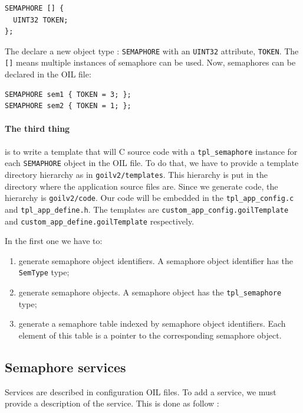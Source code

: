 \documentclass[11pt]{article}
\begin{document}
\begin{lstlisting}
SEMAPHORE [] {
  UINT32 TOKEN;
};
\end{lstlisting}

The declare a new object type : \lstinline{SEMAPHORE} with an \lstinline{UINT32} attribute, \lstinline{TOKEN}. The \lstinline{[]} means multiple instances of semaphore can be used.
Now, semaphores can be declared in the OIL file:

\begin{lstlisting}
SEMAPHORE sem1 { TOKEN = 3; };
SEMAPHORE sem2 { TOKEN = 1; };
\end{lstlisting}

\paragraph{The third thing} is to write a template that will C source code with a \lstinline{tpl_semaphore} instance for each \lstinline{SEMAPHORE} object in the OIL file. To do that, we have to provide a template directory hierarchy as in \lstinline{goilv2/templates}. This hierarchy is put in the directory where the application source files are. Since we generate code, the hierarchy is \lstinline{goilv2/code}. Our code  will be embedded in the \lstinline{tpl_app_config.c} and \lstinline{tpl_app_define.h}. The templates are \lstinline{custom_app_config.goilTemplate} and \lstinline{custom_app_define.goilTemplate} respectively.

In the first one we have to:
\begin{enumerate}
\item generate semaphore object identifiers. A semaphore object identifier has the \lstinline{SemType} type;
\item generate semaphore objects. A semaphore object has the \lstinline{tpl_semaphore} type;
\item generate a semaphore table indexed by semaphore object identifiers. Each element of this table is a pointer to the corresponding semaphore object.
\end{enumerate}

\subsection{Semaphore services}

Services are described in configuration OIL files. To add a service, we must provide a description of the service. This is done as follow :
\end{document}

